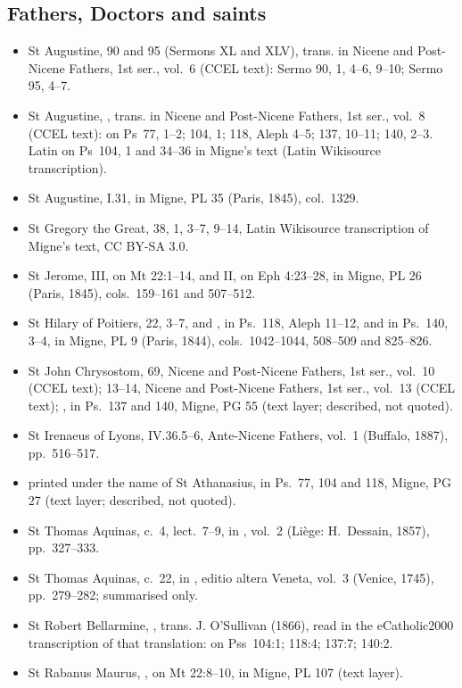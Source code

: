 {\subsection*{Fathers, Doctors and saints}
\begin{itemize}
\item St Augustine,  90 and 95 (Sermons XL and XLV), trans. in Nicene and Post-Nicene Fathers, 1st ser., vol.~6 (CCEL text): Sermo 90, 1, 4--6, 9--10; Sermo 95, 4--7.
\item St Augustine, , trans. in Nicene and Post-Nicene Fathers, 1st ser., vol.~8 (CCEL text): on Ps~77, 1--2; 104, 1; 118, Aleph 4--5; 137, 10--11; 140, 2--3. Latin on Ps~104, 1 and 34--36 in Migne's text (Latin Wikisource transcription).
\item St Augustine,  I.31, in Migne, PL 35 (Paris, 1845), col.~1329.
\item St Gregory the Great,  38, 1, 3--7, 9--14, Latin Wikisource transcription of Migne's text, CC BY-SA 3.0.
\item St Jerome,  III, on Mt 22:1--14, and  II, on Eph 4:23--28, in Migne, PL 26 (Paris, 1845), cols.~159--161 and 507--512.
\item St Hilary of Poitiers,  22, 3--7, and , in Ps.~118, Aleph 11--12, and in Ps.~140, 3--4, in Migne, PL 9 (Paris, 1844), cols.~1042--1044, 508--509 and 825--826.
\item St John Chrysostom,  69, Nicene and Post-Nicene Fathers, 1st ser., vol.~10 (CCEL text);  13--14, Nicene and Post-Nicene Fathers, 1st ser., vol.~13 (CCEL text); , in Ps.~137 and 140, Migne, PG 55 (text layer; described, not quoted).
\item St Irenaeus of Lyons,  IV.36.5--6, Ante-Nicene Fathers, vol.~1 (Buffalo, 1887), pp.~516--517.
\item {} printed under the name of St Athanasius, in Ps.~77, 104 and 118, Migne, PG 27 (text layer; described, not quoted).
\item St Thomas Aquinas,  c.~4, lect.~7--9, in , vol.~2 (Liège: H.~Dessain, 1857), pp.~327--333.
\item St Thomas Aquinas,  c.~22, in , editio altera Veneta, vol.~3 (Venice, 1745), pp.~279--282; summarised only.
\item St Robert Bellarmine, , trans. J. O'Sullivan (1866), read in the eCatholic2000 transcription of that translation: on Pss~104:1; 118:4; 137:7; 140:2.
\item St Rabanus Maurus, , on Mt 22:8--10, in Migne, PL 107 (text layer).
\end{itemize}

}
